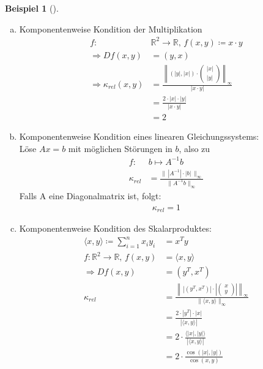 \documentclass[ngerman,fontsize=11pt, paper=a4, parskip=half, titlepage=true, toc=bib]{scrbook}
\theoremstyle{definition}
\newtheorem{Bsp}[Def]{Beispiel}
\theoremstyle{plain}
\newcommand{\R}{\mathds{R}}
\newcommand{\subsectione}[1]{\addtocounter{Def}{1}\subsection{#1}}
\newenvironment{Bspe}[1][]{ %
	\begin{Bsp}[#1]
	}
	{
	\end{Bsp}
	\addtocounter{subsection}{1}
}
\begin{document}
\begin{Bspe}~
	\begin{enumerate}[a)]
		\item Komponentenweise Kondition der Multiplikation
		\begin{align*}
		f:&\R^2 \rightarrow \R, \, f(x,y) \coloneqq x\cdot y \\
		\Rightarrow Df(x,y) &= (y, x)  \\
		\Rightarrow \kappa_{rel}(x,y) &= \frac{\left\| (|y|, |x|)\cdot \begin{pmatrix}
			|x| \\
			|y|
			\end{pmatrix}\right\|_\infty}
			{|x\cdot y|} \\
			&= \frac{2\cdot|x|\cdot |y|}{|x\cdot y|} \\
			&= 2
			\end{align*}
			\item Komponentenweise Kondition eines linearen Gleichungssystems:\\
			Löse $Ax=b$ mit möglichen Störungen in $b$, also zu
			\begin{align*}
			f: & b\mapsto A^{-1}b \\
			\kappa_{rel} & = \frac{\| \, |A^{-1}| \cdot |b|\, \|_\infty}{\|A^{-1}b\|_\infty}
			\end{align*}
			Falls A eine Diagonalmatrix ist, folgt:
			\begin{gather*}
			\kappa_{rel}=1
			\end{gather*}
			\item Komponentenweise Kondition des Skalarproduktes:
			\begin{align*}
			\langle x,y \rangle \coloneqq \sum_{i=1}^{n}x_i y_i& = x^Ty \\
			f: \R^2 \rightarrow \R, \, f(x,y) &= \langle x,y \rangle \\
			\Rightarrow Df(x,y) &= (y^T, x^T) \\
			\kappa_{rel}  &= \frac{\left\| \,\left|(y^T, x^T)\right|\cdot\left|\begin{pmatrix}
				x \\
				y
				\end{pmatrix}\right|\right\|_\infty }
				{\|\langle x,y\rangle\|_\infty}\\
				&= \frac{2\cdot |y^T|\cdot |x|}{|\langle x,y\rangle|} \\
				&= 2\cdot \frac{\langle |x|,|y|\rangle}{|\langle x,y\rangle|} \\
				&= 2 \cdot \frac{\cos(|x|, |y|)}{\cos(x,y)}  \\

\end{align*}
\end{enumerate}
\end{Bspe}
\end{document}
